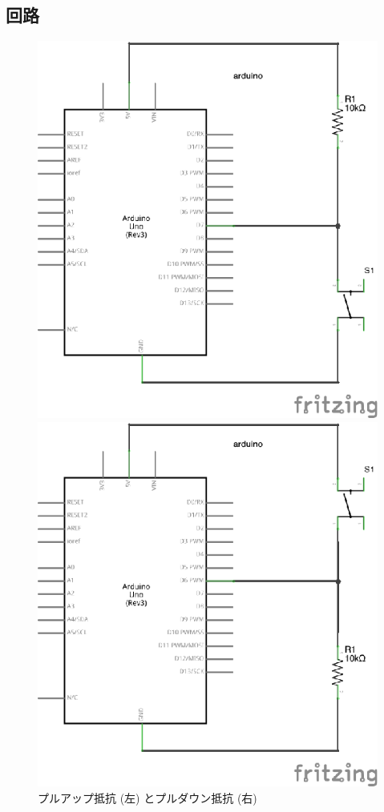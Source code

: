 \documentclass[11pt,a4paper]{jarticle}
\begin{document}

\subsection{回路}
\begin{figure}[htbp]
 \begin{minipage}{0.5\columnwidth}
  \centering
  \includegraphics[width=0.62\columnwidth]{img/pullup.eps}
 \end{minipage}
 \begin{minipage}{0.5\columnwidth}
  \centering
  \includegraphics[width=0.62\columnwidth]{img/pulldown.eps}
 \end{minipage}
  \caption{プルアップ抵抗 (左) とプルダウン抵抗 (右)}
\end{figure}
\end{document}
